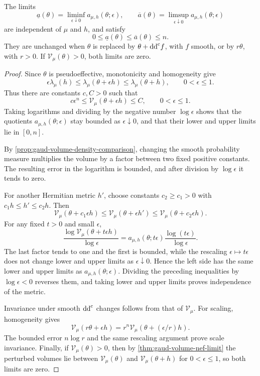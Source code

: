 \begin{proposition}\label{prop:nef-degeneration-orders}
The limits
\[
 \underline a(\theta)=\liminf_{\epsilon\downarrow0}
                         a_{\mu,h}(\theta;\epsilon),
 \qquad
 \overline a(\theta)=\limsup_{\epsilon\downarrow0}
                         a_{\mu,h}(\theta;\epsilon)
\]
are independent of $\mu$ and $h$, and satisfy
\[
 0\leq\underline a(\theta)\leq\overline a(\theta)\leq n.
\]
They are unchanged when $\theta$ is replaced by $\theta+\mathrm{dd}^{\mathrm{c}} f$, with $f$ smooth, or by $r\theta$, with $r>0$. If $\mathcal V_\mu(\theta)>0$, both limits are zero.
\end{proposition}
\begin{proof}
Since $\theta$ is pseudoeffective, monotonicity and homogeneity give
\[
 \epsilon\lambda_\mu(h)
       \leq\lambda_\mu(\theta+\epsilon h)
       \leq\lambda_\mu(\theta+h),
 \qquad 0<\epsilon\leq1.
\]
Thus there are constants $c,C>0$ such that
\[
 c\epsilon^n\leq\mathcal V_\mu(\theta+\epsilon h)\leq C,
 \qquad 0<\epsilon\leq1.
\]
Taking logarithms and dividing by the negative number $\log\epsilon$ shows that the quotients $a_{\mu,h}(\theta;\epsilon)$ stay bounded as $\epsilon\downarrow0$, and that their lower and upper limits lie in $[0,n]$.

By \cref{prop:gaud-volume-density-comparison}, changing the smooth probability measure multiplies the volume by a factor between two fixed positive constants. The resulting error in the logarithm is bounded, and after division by $\log\epsilon$ it tends to zero.

For another Hermitian metric $h'$, choose constants $c_2\geq c_1>0$ with $c_1h\leq h'\leq c_2h$. Then
\[
 \mathcal V_\mu(\theta+c_1\epsilon h)
 \leq\mathcal V_\mu(\theta+\epsilon h')
 \leq\mathcal V_\mu(\theta+c_2\epsilon h).
\]
For any fixed $t>0$ and small $\epsilon$,
\[
 \frac{\log\mathcal V_\mu(\theta+t\epsilon h)}{\log\epsilon}
 =a_{\mu,h}(\theta;t\epsilon)
       \frac{\log(t\epsilon)}{\log\epsilon}.
\]
The last factor tends to one and the first is bounded, while the rescaling $\epsilon\mapsto t\epsilon$ does not change lower and upper limits as $\epsilon\downarrow0$. Hence the left side has the same lower and upper limits as $a_{\mu,h}(\theta;\epsilon)$. Dividing the preceding inequalities by $\log\epsilon<0$ reverses them, and taking lower and upper limits proves independence of the metric.

Invariance under smooth $\mathrm{dd}^{\mathrm{c}}$ changes follows from that of $\mathcal V_\mu$. For scaling, homogeneity gives
\[
 \mathcal V_\mu(r\theta+\epsilon h)
       =r^n\mathcal V_\mu(\theta+(\epsilon/r)h).
\]
The bounded error $n\log r$ and the same rescaling argument prove scale invariance. Finally, if $\mathcal V_\mu(\theta)>0$, then by \cref{thm:gaud-volume-nef-limit} the perturbed volumes lie between $\mathcal V_\mu(\theta)$ and $\mathcal V_\mu(\theta+h)$ for $0<\epsilon\leq1$, so both limits are zero.
\end{proof}

